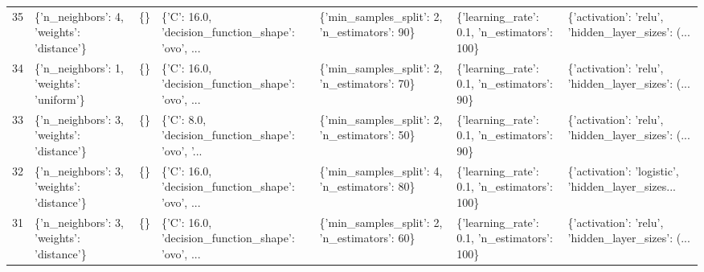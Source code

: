 \begin{tabular}{lllllll}
35  &  \{'n\_neighbors': 4, 'weights': 'distance'\} &  \{\} &  \{'C': 16.0, 'decision\_function\_shape': 'ovo', ... &   \{'min\_samples\_split': 2, 'n\_estimators': 90\} &  \{'learning\_rate': 0.1, 'n\_estimators': 100\} &  \{'activation': 'relu', 'hidden\_layer\_sizes': (... \\
34  &   \{'n\_neighbors': 1, 'weights': 'uniform'\} &  \{\} &  \{'C': 16.0, 'decision\_function\_shape': 'ovo', ... &   \{'min\_samples\_split': 2, 'n\_estimators': 70\} &   \{'learning\_rate': 0.1, 'n\_estimators': 90\} &  \{'activation': 'relu', 'hidden\_layer\_sizes': (... \\
33  &  \{'n\_neighbors': 3, 'weights': 'distance'\} &  \{\} &  \{'C': 8.0, 'decision\_function\_shape': 'ovo', '... &   \{'min\_samples\_split': 2, 'n\_estimators': 50\} &   \{'learning\_rate': 0.1, 'n\_estimators': 90\} &  \{'activation': 'relu', 'hidden\_layer\_sizes': (... \\
32  &  \{'n\_neighbors': 3, 'weights': 'distance'\} &  \{\} &  \{'C': 16.0, 'decision\_function\_shape': 'ovo', ... &   \{'min\_samples\_split': 4, 'n\_estimators': 80\} &  \{'learning\_rate': 0.1, 'n\_estimators': 100\} &  \{'activation': 'logistic', 'hidden\_layer\_sizes... \\
31  &  \{'n\_neighbors': 3, 'weights': 'distance'\} &  \{\} &  \{'C': 16.0, 'decision\_function\_shape': 'ovo', ... &   \{'min\_samples\_split': 2, 'n\_estimators': 60\} &  \{'learning\_rate': 0.1, 'n\_estimators': 100\} &  \{'activation': 'relu', 'hidden\_layer\_sizes': (... \\
\bottomrule
\end{tabular}
